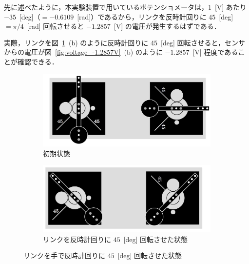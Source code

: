         先に述べたように，本実験装置で用いているポテンショメータは，$1$~[V] あたり $-35$~[deg]（$= -0.6109$~[rad]）であるから，リンクを反時計回りに $45$~[deg] $= \pi/4$~[rad] 回転させると $-1.2857$~[V] の電圧が発生するはずである．
        
        実際，リンクを図~\ref{fig:adconv_run_start}~(b) のように反時計回りに $45$~[deg] 回転させると，センサからの電圧が図~\ref{fig:voltage_-1.2857V}~(b) のように $-1.2857$~[V] 程度であることが確認できる．



\begin{figure}[htbp]
    \centering
    \begin{subfigure}[b]{0.45\linewidth}
        \centering
        \includegraphics[width=\linewidth]{figure/link_0deg.pdf}
        \caption{初期状態}
    \end{subfigure}
    \hfill
    \begin{subfigure}[b]{0.45\linewidth}
        \centering
        \includegraphics[width=\linewidth]{figure/link_45deg.pdf}
        \caption{リンクを反時計回りに $45$~[deg] 回転させた状態}
    \end{subfigure}
    \caption{リンクを手で反時計回りに $45$~[deg] 回転させた状態}
    \label{fig:adconv_run_start}
\end{figure}

